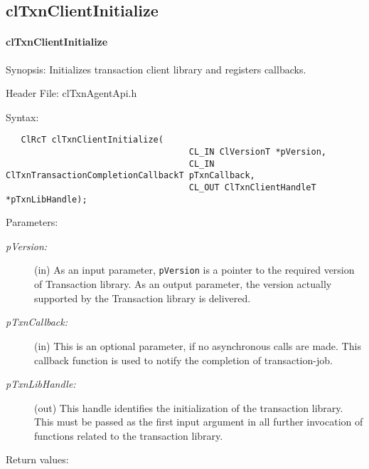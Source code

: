 \begin{flushleft}
\subsection{clTxnClientInitialize}
\hypertarget{pagetxn201}{}\paragraph{cl\-Txn\-Client\-Initialize}\label{pagetxn201}
\begin{Desc}
\item[Synopsis:]Initializes transaction client library and registers callbacks.\end{Desc}
\begin{Desc}
\item[Header File:]clTxnAgentApi.h\end{Desc}
\begin{Desc}
\item[Syntax:]
\footnotesize\begin{verbatim}   ClRcT clTxnClientInitialize(
                            		CL_IN ClVersionT *pVersion,
                            		CL_IN ClTxnTransactionCompletionCallbackT pTxnCallback,
                            		CL_OUT ClTxnClientHandleT *pTxnLibHandle);
\end{verbatim}
\normalsize
\end{Desc}
\begin{Desc}
\item[Parameters:]
\begin{description}
\item[{\em p\-Version:}](in) As an input parameter, {\tt{pVersion}} is a pointer
 to the required version of Transaction library.  As an output
 parameter, the version actually supported by the Transaction library
 is delivered.
\item[{\em p\-Txn\-Callback:}](in) This is an optional parameter, if no asynchronous
  calls are made. This callback function is used to notify the completion of
  transaction-job.
\item[{\em p\-Txn\-Lib\-Handle:}](out) This handle identifies the 
 initialization of the transaction library. This must be passed as the first
 input argument in all further invocation of functions related to the
 transaction library.
\end{description}
\end{Desc}
\begin{Desc}
\item[Return values:]

\end{Desc}
\end{flushleft}
